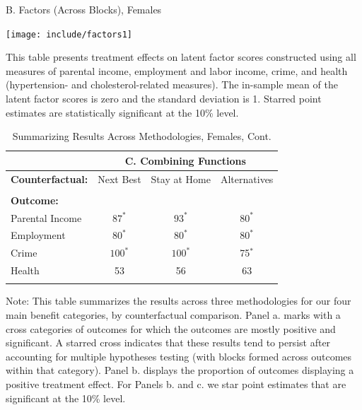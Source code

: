 \documentclass[static]{JJH-Beamer}
\begin{document}
\begin{frame}
 \addtocounter{framenumber}{-1}

\begin{table}[H]
\addtocounter{table}{-1}
\caption{B. Factors (Across Blocks), Females}
\begin{center}
\texttt{[image: include/factors1]}
\end{center}
\end{table}
{\flushleft \tiny This table presents treatment effects on latent factor scores constructed using all measures of parental income, employment and labor income, crime, and health (hypertension- and cholesterol-related measures). The in-sample mean of the latent factor scores is zero and the standard deviation is 1. Starred point estimates are statistically significant at the 10\% level.\\}

\end{frame}

\begin{frame}
 \addtocounter{framenumber}{-1}

\begin{table}[H]
\addtocounter{table}{-1}
\caption{Summarizing Results Across Methodologies, Females, Cont.}
\begin{center}
\begin{tabular}{lccc}
\toprule
& \multicolumn{3}{c}{\textbf{C. Combining Functions}}  \\
 \midrule
 \textbf{Counterfactual:} & Next Best & Stay at Home & Alternatives  \\ \\
 \textbf{Outcome:} & \\
Parental Income & $87^*$ & $93^*$ & $80^*$  \\
Employment & $80^*$ & $80^*$ & $80^*$ \\
Crime &  $100^*$ & $100^*$ & 75$^*$ \\
Health & 53 & 56 & 63  \\ \\
\bottomrule
\end{tabular}
\end{center}
\tiny\flushleft Note: This table summarizes the results across three methodologies for our four main benefit categories, by counterfactual comparison. Panel a. marks with a cross categories of outcomes for which the outcomes are mostly positive and significant. A starred cross indicates that these results tend to persist after accounting for multiple hypotheses testing (with blocks formed across outcomes within that category). Panel b. displays the proportion of outcomes displaying a positive treatment effect. For Panels b. and c. we star point estimates that are significant at the 10\% level.\\
\end{table}

\end{frame}
\end{document}

